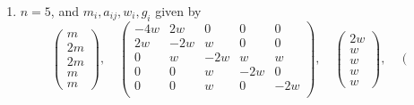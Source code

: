 \begin{lemma}
\begin{enumerate}
$$\begin{matrix}
2m \\
m \\
m \\
m \\
m
\end{matrix}
\right),
\quad
\left(
\begin{matrix}
-2w & w & w & w & w \\
w & -2w & 0 & 0 & 0 \\
w & 0 & -2w & 0 & 0 \\
w & 0 & 0 & -2w & 0 \\
w & 0 & 0 & 0 & -2w \\
\end{matrix}
\right),
\quad
\left(
\begin{matrix}
w \\
w \\
w \\
w \\
w
\end{matrix}
\right),
\quad
\left(
\begin{matrix}
0 \\
0 \\
0 \\
0 \\
0
\end{matrix}
\right)
$$
with $w$ and $m$ arbitrary,
\item
\label{models-item-triple-extended-up}
$n = 5$, and $m_i, a_{ij}, w_i, g_i$ given by
$$
\left(
\begin{matrix}
m \\
2m \\
2m \\
m \\
m
\end{matrix}
\right),
\quad
\left(
\begin{matrix}
-4w & 2w & 0 & 0 & 0 \\
2w & -2w & w & 0 & 0 \\
0 & w & -2w & w & w \\
0 & 0 & w & -2w & 0 \\
0 & 0 & w & 0 & -2w \\
\end{matrix}
\right),
\quad
\left(
\begin{matrix}
2w \\
w \\
w \\
w \\
w
\end{matrix}
\right),
\quad
\left(
\begin{matrix}

\end{matrix}$$
\end{enumerate}
\end{lemma}
